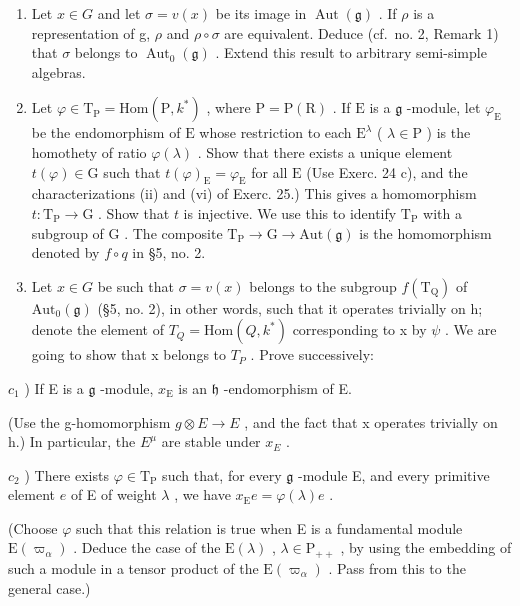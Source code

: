 \begin{enumerate}
\def\labelenumi{\alph{enumi})}
\item
  Let \(x \in G\) and let \(\sigma = v(x)\) be its image in \(\operatorname{Aut}(\mathfrak{g})\) . If \(\rho\) is a representation of g, \(\rho\) and \(\rho \circ \sigma\) are equivalent. Deduce (cf.~no. 2, Remark 1) that \(\sigma\) belongs to \(\operatorname{Aut}_{0}(\mathfrak{g})\) . Extend this result to arbitrary semi-simple algebras.
\item
  Let \(\varphi \in \mathrm{T}_{\mathrm{P}} = \mathrm{Hom}(\mathrm{P}, k^{*})\) , where \(\mathrm{P} = \mathrm{P}(\mathrm{R})\) . If \(\mathrm{E}\) is a \(\mathfrak{g}\) -module, let \(\varphi_{\mathrm{E}}\) be the endomorphism of \(\mathrm{E}\) whose restriction to each \(\mathrm{E}^{\lambda}\) ( \(\lambda \in \mathrm{P}\) ) is the homothety of ratio \(\varphi(\lambda)\) . Show that there exists a unique element \(t(\varphi) \in \mathrm{G}\) such that \(t(\varphi)_{\mathrm{E}} = \varphi_{\mathrm{E}}\) for all \(\mathrm{E}\) (Use Exerc. 24 c), and the characterizations (ii) and (vi) of Exerc. 25.) This gives a homomorphism \(t: \mathrm{T}_{\mathrm{P}} \to \mathrm{G}\) . Show that \(t\) is injective. We use this to identify \(\mathrm{T}_{\mathrm{P}}\) with a subgroup of \(\mathrm{G}\) . The composite \(\mathrm{T}_{\mathrm{P}} \to \mathrm{G} \to \mathrm{Aut}(\mathfrak{g})\) is the homomorphism denoted by \(f \circ q\) in §5, no. 2.
\item
  Let \(x \in G\) be such that \(\sigma = v(x)\) belongs to the subgroup \(f(\mathrm{T}_{\mathrm{Q}})\) of \(\mathrm{Aut}_{0}(\mathfrak{g})\) (§5, no. 2), in other words, such that it operates trivially on h; denote the element of \(T_{Q} = \mathrm{Hom}(Q, k^{*})\) corresponding to x by \(\psi\) . We are going to show that x belongs to \(T_{P}\) . Prove successively:
\end{enumerate}

\(c_{1}\) ) If E is a \(\mathfrak{g}\) -module, \(x_{\mathrm{E}}\) is an \(\mathfrak{h}\) -endomorphism of E.

(Use the g-homomorphism \(g \otimes E \to E\) , and the fact that x operates trivially on h.) In particular, the \(E^{\mu}\) are stable under \(x_{E}\) .

\(c_{2}\) ) There exists \(\varphi \in \mathrm{T}_{\mathrm{P}}\) such that, for every \(\mathfrak{g}\) -module E, and every primitive element \(e\) of E of weight \(\lambda\) , we have \(x_{\mathrm{E}}e = \varphi (\lambda)e\) .

(Choose \(\varphi\) such that this relation is true when E is a fundamental module \(\mathrm{E}(\varpi_{\alpha})\) . Deduce the case of the \(\mathrm{E}(\lambda)\) , \(\lambda \in \mathrm{P}_{++}\) , by using the embedding of such a module in a tensor product of the \(\mathrm{E}(\varpi_{\alpha})\) . Pass from this to the general case.)

